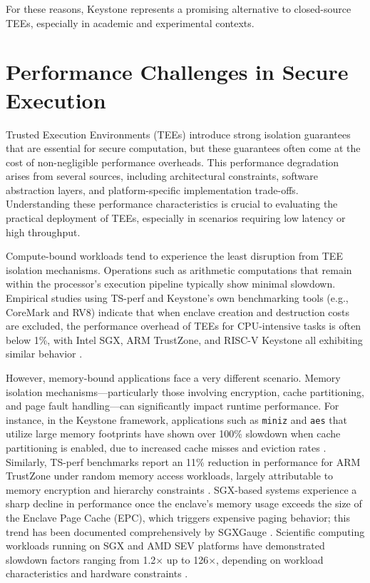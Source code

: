 For these reasons, Keystone represents a promising alternative to closed-source TEEs, especially in academic and experimental contexts.


\section{Performance Challenges in Secure Execution}

Trusted Execution Environments (TEEs) introduce strong isolation guarantees that are essential for secure computation, but these guarantees often come at the cost of non-negligible performance overheads. This performance degradation arises from several sources, including architectural constraints, software abstraction layers, and platform-specific implementation trade-offs. Understanding these performance characteristics is crucial to evaluating the practical deployment of TEEs, especially in scenarios requiring low latency or high throughput.

Compute-bound workloads tend to experience the least disruption from TEE isolation mechanisms. Operations such as arithmetic computations that remain within the processor’s execution pipeline typically show minimal slowdown. Empirical studies using TS-perf and Keystone’s own benchmarking tools (e.g., CoreMark and RV8) indicate that when enclave creation and destruction costs are excluded, the performance overhead of TEEs for CPU-intensive tasks is often below 1\%, with Intel SGX, ARM TrustZone, and RISC-V Keystone all exhibiting similar behavior \cite{Suzaki2021,dayeol2019keystone}.

However, memory-bound applications face a very different scenario. Memory isolation mechanisms—particularly those involving encryption, cache partitioning, and page fault handling—can significantly impact runtime performance. For instance, in the Keystone framework, applications such as \texttt{miniz} and \texttt{aes} that utilize large memory footprints have shown over 100\% slowdown when cache partitioning is enabled, due to increased cache misses and eviction rates \cite{dayeol2019keystone}. Similarly, TS-perf benchmarks report an 11\% reduction in performance for ARM TrustZone under random memory access workloads, largely attributable to memory encryption and hierarchy constraints \cite{Suzaki2021}. SGX-based systems experience a sharp decline in performance once the enclave's memory usage exceeds the size of the Enclave Page Cache (EPC), which triggers expensive paging behavior; this trend has been documented comprehensively by SGXGauge \cite{kumar2022sgxgauge}. Scientific computing workloads running on SGX and AMD SEV platforms have demonstrated slowdown factors ranging from 1.2× up to 126×, depending on workload characteristics and hardware constraints \cite{akkram2020scientific}.

